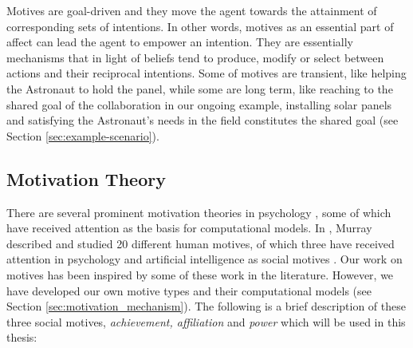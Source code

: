 \documentclass[12pt]{report}
\begin{document}
Motives are goal-driven and they move the agent towards the attainment of
corresponding sets of intentions. In other words, motives as an essential part
of affect can lead the agent to empower an intention. They are essentially
mechanisms that in light of beliefs tend to produce, modify or select between
actions and their reciprocal intentions. Some of motives are transient, like
helping the Astronaut to hold the panel, while some are long term, like reaching
to the shared goal of the collaboration in our ongoing example, installing
solar panels and satisfying the Astronaut's needs in the field constitutes
the shared goal (see Section \ref{sec:example-scenario}).

\subsection{Motivation Theory}
\label{section-motivation-theory}

There are several prominent motivation theories in psychology
\cite{beck:motivation, graham:motivation, laming:understanding-motivation}, some
of which have received attention as the basis for computational models. In
\cite{murray:personality-exploration}, Murray described and studied 20 different
human motives, of which three have received attention in psychology and
artificial intelligence as social motives
\cite{merrick:acheievement-affiliation-power,
zurbriggen:linking-motives-emotions}. {\color{red}Our work on motives has been
inspired by some of these work in the literature. However, we have developed our
own motive types and their computational models (see Section
\ref{sec:motivation_mechanism}).} The following is a brief description of these
three social motives, \textit{achievement, affiliation} and \textit{power}
\cite{atkinson:motives-action-society,zurbriggen:linking-motives-emotions}
which will be used in this thesis:
\end{document}
